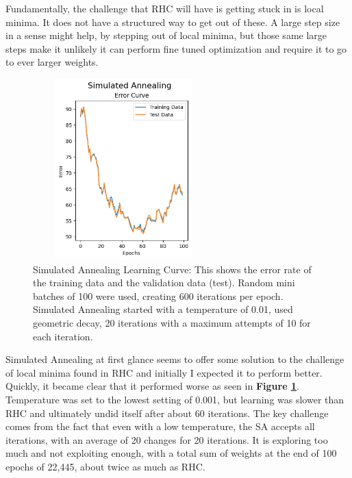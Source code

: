 \documentclass[letterpaper]{article} %
\begin{document}
Fundamentally, the challenge that RHC will have is getting stuck in is local minima.  It does not have a structured way to get out of these.  A large step size in a sense might help, by stepping out of local minima, but those same large steps make it unlikely it can perform fine tuned optimization and require it to go to ever larger weights.   


\begin{figure}[!htb]
\centering
\includegraphics[width=2.75in, height=2.75in]{figures/Simulated_Annealing__algorithm_sa_epochs_100_temperature_0.01_decay_geom_max_iters_20_max_attempts_5_seed_1_.png}
\caption{Simulated Annealing Learning Curve: This shows the error rate of the training data and the validation data (test).  Random mini batches of 100 were used, creating 600 iterations per epoch.  Simulated Annealing started with a temperature of 0.01, used geometric decay,  20 iterations with a maximum attempts of 10 for each iteration.  }
\label{fig:nn_sa_initial}
\end{figure}

Simulated Annealing at first glance seems to offer some solution to the challenge of local minima found in RHC and initially I expected it to perform better.  Quickly, it became clear that it performed worse as seen in \textbf{Figure \ref{fig:nn_sa_initial}}.  Temperature was set to the lowest setting of 0.001, but learning was slower than RHC and ultimately undid itself after about 60 iterations.  The key challenge comes from the fact that even with a low temperature, the SA accepts all iterations, with an average of 20 changes for 20 iterations.  It is exploring too much and not exploiting enough, with a total sum of weights at the end of 100 epochs of 22,445, about twice as much as RHC. 
\end{document}
